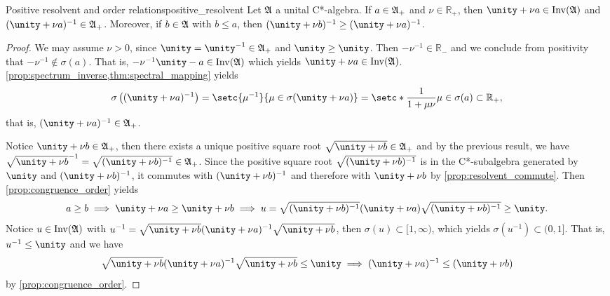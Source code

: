 \begin{proposition}{Positive resolvent and order relations}{positive_resolvent}
    Let \(\mathfrak{A}\) a unital C*-algebra. If \(a \in \mathfrak{A}_+\) and \(\nu \in \mathbb{R}_+\), then \(\unity + \nu a \in \invertible{\algebra{A}}\) and \((\unity + \nu a)^{-1} \in \algebra{A}_+\). Moreover, if \(b \in \mathfrak{A}\) with \(b \leq a\), then \((\unity +\nu b)^{-1} \geq (\unity + \nu a)^{-1}\).
\end{proposition}
\begin{proof}
    We may assume \(\nu > 0\), since \(\unity = \unity^{-1} \in \algebra{A}_+\) and \(\unity \geq \unity\). Then \(-\nu^{-1} \in \mathbb{R}_-\) and we conclude from positivity that \(-\nu^{-1} \notin \sigma(a)\). That is, \(-\nu^{-1} \unity - a \in \invertible{\algebra{A}}\) which yields \(\unity + \nu a \in \invertible{\algebra{A}}\). \cref{prop:spectrum_inverse,thm:spectral_mapping} yields
    \begin{equation*}
        \sigma\left((\unity + \nu a)^{-1}\right) = \setc{\mu^{-1}}{\mu \in \sigma(\unity + \nu a)} = \setc*{\frac1{1 + \mu \nu}}{\mu \in \sigma(a)} \subset \mathbb{R}_+,
    \end{equation*}
    that is, \((\unity + \nu a)^{-1} \in \algebra{A}_+\).

    Notice \(\unity + \nu b \in \algebra{A}_+\), then there exists a unique positive square root \(\sqrt{\unity + \nu b} \in \algebra{A}_+\) and by the previous result, we have \(\sqrt{\unity + \nu b}^{-1} = \sqrt{(\unity + \nu b)^{-1}} \in \algebra{A}_+\). Since the positive square root \(\sqrt{(\unity + \nu b)^{-1}}\) is in the C*-subalgebra generated by \(\unity\) and \((\unity + \nu b)^{-1}\), it commutes with \((\unity + \nu b)^{-1}\) and therefore with \(\unity + \nu b\) by \cref{prop:resolvent_commute}. Then \cref{prop:congruence_order} yields
    \begin{equation*}
        a \geq b \implies \unity + \nu a \geq \unity + \nu b \implies  u = \sqrt{(\unity + \nu b)^{-1}} (\unity + \nu a) \sqrt{(\unity + \nu b)^{-1}} \geq \unity.
    \end{equation*}
    Notice \(u \in \operatorname{Inv}(\mathfrak{A})\) with \(u^{-1} = \sqrt{\unity + \nu b} (\unity + \nu a)^{-1} \sqrt{\unity + \nu b}\), then \(\sigma(u) \subset [1, \infty)\), which yields \(\sigma(u^{-1}) \subset (0, 1]\). That is, \(u^{-1} \leq \unity\) and we have
    \begin{equation*}
        \sqrt{\unity + \nu b} (\unity + \nu a)^{-1} \sqrt{\unity + \nu b} \leq \unity \implies (\unity + \nu a)^{-1} \leq (\unity + \nu b)
    \end{equation*}
    by \cref{prop:congruence_order}.
\end{proof}
